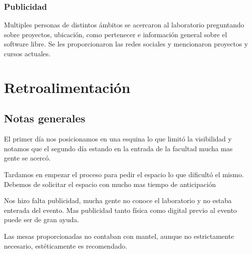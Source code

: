 \documentclass[a4paper,11pt]{article}                 %
\begin{document}
    \subsubsection{Publicidad}
      Multiples personas de distintos ámbitos se acercaron al laboratorio preguntando sobre proyectos, ubicación, como pertenecer e información general sobre el software libre. Se les proporcionaron las redes sociales y mencionaron proyectos y cursos actuales.

  \section{Retroalimentación}
  \subsection{Notas generales}
    El primer día nos posicionamos en una esquina lo que limitó la visibilidad y notamos que el segundo día estando en la entrada de la facultad mucha mas gente se acercó.

    Tardamos en empezar el proceso para pedir el espacio lo que dificultó el mismo. Debemos de solicitar el espacio con mucho mas tiempo de anticipación

    Nos hizo falta publicidad, mucha gente no conoce el laboratorio y no estaba enterada del evento. Mas publicidad tanto física como digital previo al evento puede ser de gran ayuda.

    Las mesas proporcionadas no contaban con mantel, aunque no estrictamente necesario, estéticamente es recomendado.

\end{document}
